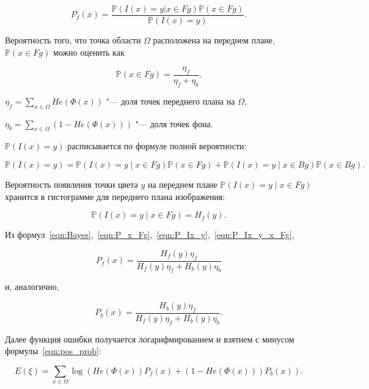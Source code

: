 \begin{equation}
\label{eqn:Bayes}
P_f(x)= \frac{\mathbb{P}(I(x) = y | x \in Fg) 
\mathbb{P}(x \in Fg)}{\mathbb{P}(I(x) = y)}
\text{.}
\end{equation}

Вероятность того, что точка области $\Omega$ расположена на переднем плане,
$\mathbb{P}(x \in Fg)$ можно оценить как

\begin{equation}
\label{eqn:P_x_Fg}
\mathbb{P}(x \in Fg) = \frac{\eta_f}{\eta_f + \eta_b}
\text{.}
\end{equation}

$
    \eta_f = \sum\limits_{x \in \Omega}He(\Phi(x))
$ "--- доля точек переднего плана на $\Omega$,

$
    \eta_b = \sum\limits_{x \in \Omega}(1 - He(\Phi(x)))
$ "--- доля точек фона.

$\mathbb{P}(I(x) = y)$ расписывается по формуле полной вероятности:

\begin{equation}
\label{eqn:P_Ix_y}
\mathbb{P}(I(x) = y) = \mathbb{P}(I(x) = y \mid x \in Fg) \mathbb{P}(x \in Fg)
+ \mathbb{P}(I(x) = y \mid x \in Bg) \mathbb{P}(x \in Bg)
\text{.}
\end{equation}

Вероятность появления точки цвета $y$ на переднем плане $\mathbb{P}(I(x) = y
\mid x \in Fg)$ хранится в гистограмме для переднего плана изображения:

\begin{equation}
\label{eqn:P_Ix_y_x_Fg}
\mathbb{P}(I(x) = y \mid x \in Fg) = H_f(y)
\text{.}
\end{equation}

Из
формул~\ref{eqn:Bayes},~\ref{eqn:P_x_Fg},~\ref{eqn:P_Ix_y},~\ref{eqn:P_Ix_y_x_Fg},

\begin{equation}
\label{eqn:P_x_Fg_y}
P_f(x)= \frac{H_f(y)\eta_f}{H_f(y)\eta_f + H_b(y)\eta_b}
\end{equation}

и, аналогично,

\begin{equation}
\label{eqn:P_x_Bg_y}
P_b(x) = \frac{H_b(y)\eta_f}{H_f(y)\eta_f + H_b(y)\eta_b}
\text{.}
\end{equation}

Далее функция ошибки получается логарифмированием и взятием с минусом
формулы~\ref{eqn:pos_prob}:

\begin{equation}
\label{err_func}
E(\xi) = \sum\limits_{x \in \Omega}
\log(He(\Phi(x))P_f(x) + (1 - He(\Phi(x)))P_b(x))
\text{.}
\end{equation}

